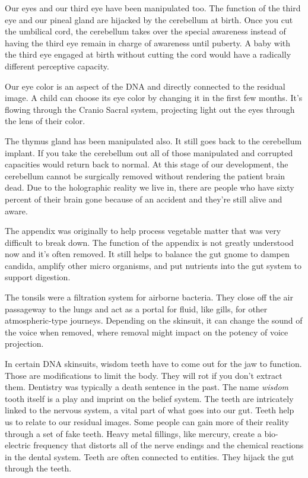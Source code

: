 Our eyes and our third eye have been manipulated too. The function of
the third eye and our pineal gland are hijacked by the cerebellum at
birth. Once you cut the umbilical cord, the cerebellum takes over the
special awareness instead of having the third eye remain in charge of
awareness until puberty. A baby with the third eye engaged at birth
without cutting the cord would have a radically different perceptive
capacity.

Our eye color is an aspect of the DNA and directly connected to the
residual image. A child can choose its eye color by changing it in the
first few months. It's flowing through the Cranio Sacral system,
projecting light out the eyes through the lens of their color.

The thymus gland has been manipulated also. It still goes back to the
cerebellum implant. If you take the cerebellum out all of those
manipulated and corrupted capacities would return back to normal. At
this stage of our development, the cerebellum cannot be surgically
removed without rendering the patient brain dead. Due to the holographic
reality we live in, there are people who have sixty percent of their
brain gone because of an accident and they're still alive and aware.

The appendix was originally to help process vegetable matter that was
very difficult to break down. The function of the appendix is not
greatly understood now and it's often removed. It still helps to balance
the gut gnome to dampen candida, amplify other micro organisms, and put
nutrients into the gut system to support digestion.

The tonsils were a filtration system for airborne bacteria. They close
off the air passageway to the lungs and act as a portal for fluid, like
gills, for other atmospheric-type journeys. Depending on the skinsuit,
it can change the sound of the voice when removed, where removal might
impact on the potency of voice projection.

In certain DNA skinsuits, wisdom teeth have to come out for the jaw to
function. Those are modifications to limit the body. They will rot if
you don't extract them. Dentistry was typically a death sentence in the
past. The name \emph{wisdom} tooth itself is a play and imprint on the
belief system. The teeth are intricately linked to the nervous system, a
vital part of what goes into our gut. Teeth help us to relate to our
residual images. Some people can gain more of their reality through a
set of fake teeth. Heavy metal fillings, like mercury, create a
bio-electric frequency that distorts all of the nerve endings and the
chemical reactions in the dental system. Teeth are often connected to
entities. They hijack the gut through the teeth.

